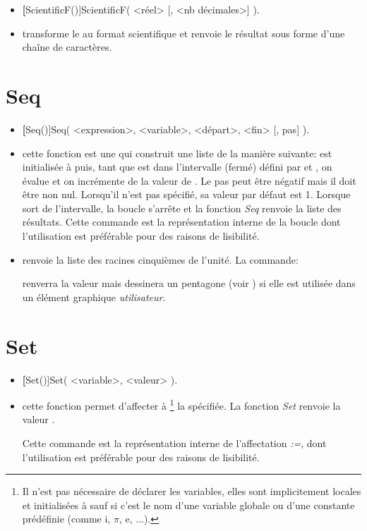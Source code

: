\begin{itemize}
 \item \util \textbf[ScientificF()]{ScientificF( <réel> [, <nb décimales>] )}.
 \item \desc transforme le  au format scientifique et renvoie le résultat sous forme d'une chaîne de caractères.
\end{itemize}


\section{Seq}\label{cmdSeq}

\begin{itemize}
 \item \util \textbf[Seq()]{Seq( <expression>, <variable>, <départ>, <fin> [, pas] )}.
 \item \desc cette fonction est une  qui construit une liste de la manière suivante:  est initialisée à  puis, tant que  est dans l'intervalle (fermé) défini par  et , on évalue  et on incrémente  de la valeur de . Le pas peut être négatif mais il doit être non nul. Lorsqu'il n'est pas spécifié, sa valeur par défaut est 1. Lorsque  sort de l'intervalle, la boucle s'arrête et la fonction \textsl{Seq} renvoie la liste des résultats. Cette commande est la représentation interne de la boucle  dont l'utilisation est préférable pour des raisons de lisibilité.
 \item \exem {} renvoie la liste des racines cinquièmes de l'unité. La commande:

\centerline{} 

 renverra la valeur \Nil mais dessinera un pentagone (voir ) si elle est utilisée dans un élément graphique \textit{utilisateur}.
\end{itemize}

\section{Set}\label{cmdSet}

\begin{itemize}
 \item \util \textbf[Set()]{Set( <variable>, <valeur> )}.
 \item \desc cette fonction permet d'affecter à \footnote{Il n'est pas nécessaire de déclarer les variables, elles sont implicitement locales et initialisées à \Nil sauf si c'est le nom d'une variable globale ou d'une constante prédéfinie (comme i, $\pi$, e, ...).} la  spécifiée. La fonction \textsl{Set} renvoie la valeur \Nil. 

 Cette commande est la représentation interne de l'affectation \textsl{:=}, dont l'utilisation est préférable pour des raisons de lisibilité.
\end{itemize} 

